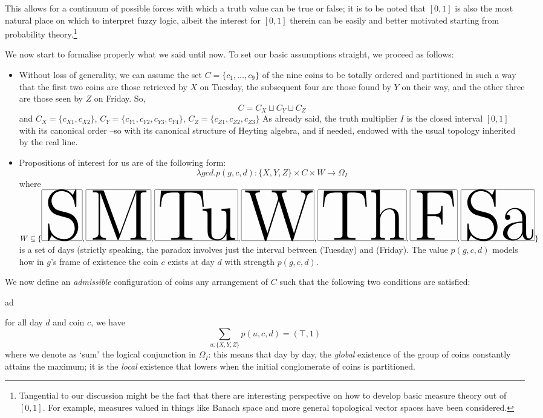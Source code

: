\begin{example}
\begin{remark}
    This allows for a continuum of possible forces with which a truth value can be true or false;  it is to be noted that $[0,1]$ is also the most natural place on which to interpret fuzzy logic, albeit the interest for $[0,1]$ therein can be easily and better motivated starting from probability theory.\footnote{Tangential to our discussion might be the fact that there are interesting perspective on how to develop basic measure theory out of $[0,1]$. For example, measures valued in things like Banach space and more general topological  vector spaces have been considered.}
  \end{remark}
  We now start to formalise properly what we said until now. To set our basic assumptions straight, we proceed as follows:
  \begin{itemize}
    \item Without loss of generality, we can assume the set $C = \{c_1,\dots,c_9\}$ of the nine coins to be totally ordered and partitioned in such a way that the first two coins are those retrieved by $X$ on Tuesday, the subsequent four are those found by $Y$ on their way, and the other three are those seen by $Z$ on Friday. So,
          \[C = C_X \sqcup C_Y \sqcup C_Z\]
          and $C_X = \{c_{X1}, c_{X2}\}$, $C_Y = \{c_{Y1},c_{Y2},c_{Y3},c_{Y4}\}$, $C_Z= \{c_{Z1}, c_{Z2}, c_{Z3}\}$ As already said, the truth multiplier $I$ is the closed interval $[0,1]$ with its canonical order --so with its canonical structure of Heyting algebra, and if needed, endowed with the usual topology inherited by the real line.
    \item Propositions of interest for us are of the following form:
          \[\lambda gcd.p(g, c, d) : \{X,Y,Z\}\times C\times W \to \Omega_I\]
          where $W \subseteq \{\S,\M,\Tu,\W, \Th,\F,\Sa\}$ is a set of days (strictly speaking, the paradox involves just the interval between \Tu (Tuesday) and \F (Friday). The value $p(g,c,d)$ models how in $g$'s frame of existence the coin $c$ exists at day $d$ with strength $p(g,c,d)$.
  \end{itemize}
  \begin{definition}
    We now define an \emph{admissible} configuration of coins any arrangement of $C$ such that the following two conditions are satisfied:
    \begin{enumtag}{ad}
      \item \label{ad:uno} for all day $d$ and coin $c$, we have
      \[
        \sum_{u: \{X,Y,Z\}} p(u,c,d) = (\top, 1)
      \]
      where we denote as `sum' the logical conjunction in $\Omega_I$: this means that day by day, the \emph{global} existence of the group of coins constantly attains the maximum; it is the \emph{local} existence that lowers when the initial conglomerate of coins is partitioned.

\end{enumtag}
\end{definition}
\end{example}

